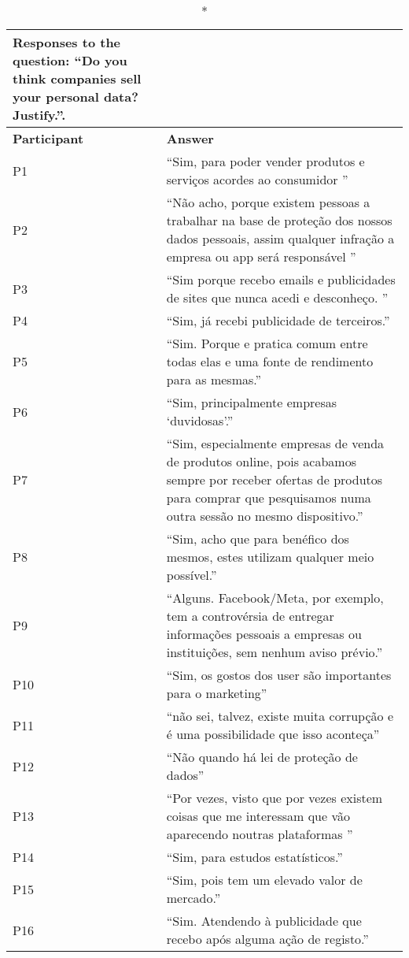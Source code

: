 \begin{longtable}{p{3cm} p{13cm}}
    \caption*{Responses to the question: ``Do you think companies sell your personal data? Justify.''.}\label{table:survey_s5_q9}\\
    \hline
    \textbf{Participant} & \textbf{Answer} \\
    \hline
    P1 & ``Sim, para poder vender produtos e serviços acordes ao consumidor '' \\
    \hline
    P2 & ``Não acho, porque existem pessoas a trabalhar na base de proteção dos nossos dados pessoais, assim qualquer infração a empresa ou app será responsável '' \\
    \hline
    P3 & ``Sim porque recebo emails e publicidades de sites que nunca acedi e desconheço. '' \\
    \hline
    P4 & ``Sim, já recebi publicidade de terceiros.'' \\
    \hline
    P5 & ``Sim. Porque e pratica comum entre todas elas e uma fonte de rendimento para as mesmas.'' \\
    \hline
    P6 & ``Sim, principalmente empresas `duvidosas'.'' \\
    \hline
    P7 & ``Sim, especialmente empresas de venda de produtos online, pois acabamos sempre por receber ofertas de produtos para comprar que pesquisamos numa outra sessão no mesmo dispositivo.'' \\
    \hline
    P8 & ``Sim, acho que para benéfico dos mesmos, estes utilizam qualquer meio possível.'' \\
    \hline
    P9 & ``Alguns. Facebook/Meta, por exemplo, tem a controvérsia de entregar informações pessoais a empresas ou instituições, sem nenhum aviso prévio.'' \\
    \hline
    P10 & ``Sim, os gostos  dos user são importantes para o marketing'' \\
    \hline
    P11 & ``não sei, talvez, existe muita corrupção e é uma possibilidade que isso aconteça'' \\
    \hline
    P12 & ``Não quando há lei de proteção de dados'' \\
    \hline
    P13 & ``Por vezes, visto que por vezes existem coisas que me interessam que vão aparecendo noutras plataformas '' \\
    \hline
    P14 & ``Sim, para estudos estatísticos.'' \\
    \hline
    P15 & ``Sim, pois tem um elevado valor de mercado.'' \\
    \hline
    P16 & ``Sim. Atendendo à publicidade que recebo após alguma ação de registo.'' \\

\end{longtable}
